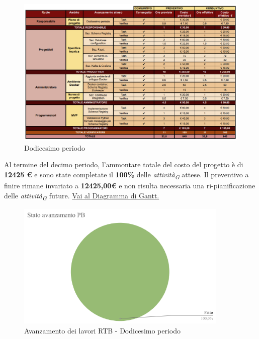 \vspace{0.4cm}

\begin{figure}[H]
    \centering
    \includegraphics[height=0.6\textwidth]{../Images/tabG12.png}
    \caption{Dodicesimo periodo}
    \label{fig:Dodicesimo_periodo}
\end{figure}

Al termine del decimo periodo, l'ammontare totale del costo del progetto è di \textbf{12425 \euro} e sono state completate il \textbf{100\%} delle \textit{attività}\textsubscript{\textit{G}} attese.
Il preventivo a finire rimane invariato a \textbf{12425,00\euro} e non risulta necessaria una ri-pianificazione delle \textit{attività}\textsubscript{\textit{G}} future.
\href{https://github.com/orgs/ByteOps-swe/projects/3/views/1?sortedBy%5Bdirection%5D=asc&sortedBy%5BcolumnId%5D=64182560}{Vai al Diagramma di Gantt.}

\begin{figure}[H]
    \centering
    \begin{minipage}[b]{0.70\textwidth}
        \centering
        \includegraphics[width=0.9\textwidth]{../Images/torta12.png}
        \caption{Avanzamento dei lavori RTB - Dodicesimo periodo}
        \label{fig:Avanzamento_RTB_12}
    \end{minipage}
\end{figure}


